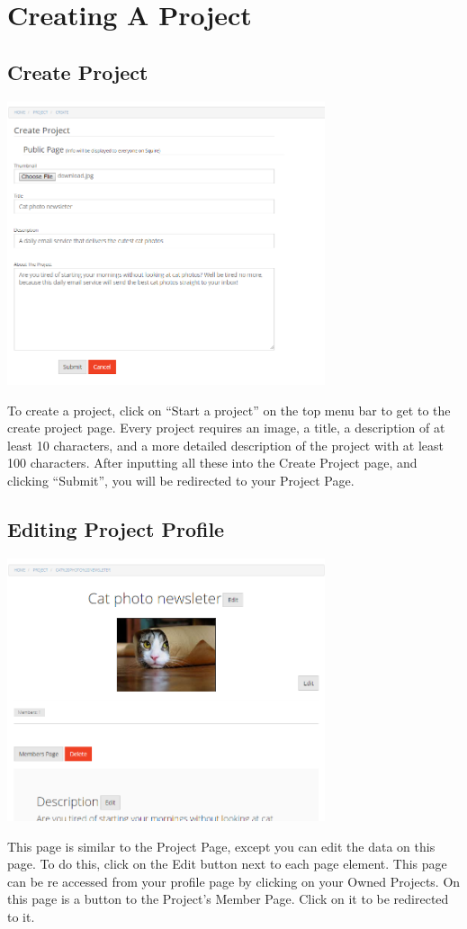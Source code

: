 \documentclass[11pt]{report}
\begin{document}
\chapter{Creating A Project}

\section{Create Project}
	\begin{center}
           \includegraphics[width=0.7\textwidth]{createproject.png}
    \end{center}
To create a project, click on “Start a project” on the top menu bar to get to the create project page. Every project requires an image, a title, a description of at least 10 characters, and a more detailed description of the project with at least 100 characters. After inputting all these into the Create Project page, and clicking “Submit”, you will be redirected to your Project Page. 

\section{Editing Project Profile}
	\begin{center}
           \includegraphics[width=0.7\textwidth]{editprojectpage.png}
    \end{center}
This page is similar to the Project Page, except you can edit the data on this page. To do this, click on the Edit button next to each page element. This page can be re accessed from your profile page by clicking on your Owned Projects. On this page is a button to the Project's Member Page. Click on it to be redirected to it.
\end{document}
